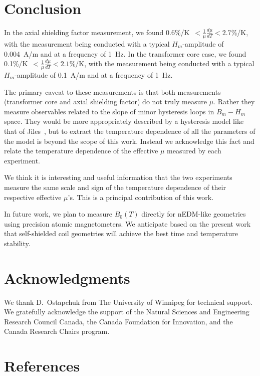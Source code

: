 \documentclass[review,number,sort&compress]{elsarticle}
\begin{document}
\section{Conclusion}

In the axial shielding factor measurement, we found
0.6\%/K~$<\frac{1}{\mu}\frac{d\mu}{dT}<2.7\%$/K, with the measurement
being conducted with a typical $H_m$-amplitude of 0.004~A/m and at a
frequency of 1~Hz.  In the transformer core case, we found
0.1\%/K~$<\frac{1}{\mu}\frac{d\mu}{dT}<2.1\%$/K, with the measurement
being conducted with a typical $H_m$-amplitude of 0.1~A/m and at a
frequency of 1~Hz.

The primary caveat to these measurements is that both measurements
(transformer core and axial shielding factor) do not truly measure
$\mu$.  Rather they measure observables related to the slope of minor
hysteresis loops in $B_m-H_m$ space.  They would be more appropriately
described by a hysteresis model like that of Jiles~\cite{bib:jiles},
but to extract the temperature dependence of all the parameters of the
model is beyond the scope of this work.  Instead we acknowledge this
fact and relate the temperature dependence of the effective $\mu$
measured by each experiment.

We think it is interesting and useful information that the two
experiments measure the same scale and sign of the temperature
dependence of their respective effective $\mu$'s.  This is a principal
contribution of this work.

In future work, we plan to measure $B_0(T)$ directly for nEDM-like
geometries using precision atomic magnetometers.  We anticipate based
on the present work that self-shielded coil geometries will achieve
the best time and temperature stability.



\section{Acknowledgments}

We thank D.~Ostapchuk from The University of Winnipeg for technical
support.  We gratefully acknowledge the support of the Natural
Sciences and Engineering Research Council Canada, the Canada
Foundation for Innovation, and the Canada Research Chairs program.


\section*{References}
\end{document}
